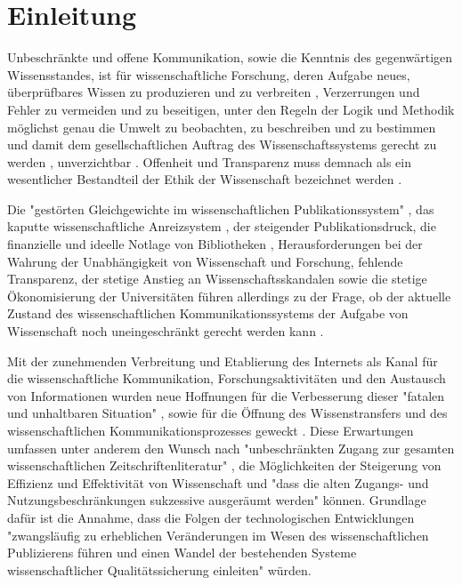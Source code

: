 \chapter{Einleitung}

Unbeschränkte und offene Kommunikation, sowie die Kenntnis des gegenwärtigen Wissensstandes, ist für wissenschaftliche Forschung, deren Aufgabe neues, überprüfbares Wissen zu produzieren \cite[:551]{Luescher_2014} \cite[:298]{Luhmann1998} und zu verbreiten \cite[:100]{graefen2007_wissenschaftliche_artikel}, Verzerrungen und Fehler zu vermeiden und zu beseitigen, unter den Regeln der Logik und Methodik \cite[:93]{Weber_1992} möglichst genau die Umwelt zu beobachten, zu beschreiben und zu bestimmen \cite[:124]{Luhmann1998} und damit dem gesellschaftlichen Auftrag des Wissenschaftssystems gerecht zu werden \cite[:3]{Hanekop_2014}, unverzichtbar \cite{glaeser2006} \cite{gibbons_1994}. Offenheit und Transparenz muss demnach als ein wesentlicher Bestandteil der Ethik der Wissenschaft bezeichnet werden \cite{Peters_2014} \cite{resnik_2005_ethics}.

Die "gestörten Gleichgewichte im wissenschaftlichen Publikationssystem" \cite{cite:0}, das kaputte wissenschaftliche Anreizsystem \cite{osterloh2008anreize}, der steigender Publikationsdruck, die finanzielle und ideelle Notlage von Bibliotheken \cite{russell_2008_business} \cite{Sietmann_oa_2007}, Herausforderungen bei der Wahrung der Unabhängigkeit von Wissenschaft und Forschung, fehlende Transparenz, der stetige Anstieg an Wissenschaftsskandalen \cite{brembs2015open} sowie die stetige Ökonomisierung der Universitäten \cite{bauer2006} führen allerdings zu der Frage, ob der aktuelle Zustand des wissenschaftlichen Kommunikationssystems der Aufgabe von Wissenschaft noch uneingeschränkt gerecht werden kann \cite{Schekman_2013}.

Mit der zunehmenden Verbreitung und Etablierung des Internets als Kanal für die wissenschaftliche Kommunikation, Forschungsaktivitäten und den Austausch von Informationen wurden neue Hoffnungen für die Verbesserung dieser "fatalen und unhaltbaren Situation" \cite{brembs2015open}, sowie für die Öffnung des Wissenstransfers \cite{schulze_2013_open} \cite{albert_2006_open_implications} und des wissenschaftlichen Kommunikationsprozesses geweckt \cite{Hanekop_2014} \cite{EuropeanCommission_sciencepub_2006} \cite{Goodrum_2001} \cite{Lawrence_1999}. Diese Erwartungen umfassen unter anderem den Wunsch nach "unbeschränkten Zugang zur gesamten wissenschaftlichen Zeitschriftenliteratur" \cite{boai_2002}, die Möglichkeiten der Steigerung von Effizienz und Effektivität von Wissenschaft \cite{Partha_1994_economics_science} und "dass die alten Zugangs- und Nutzungsbeschränkungen sukzessive ausgeräumt werden" \cite{boai_2002} können. Grundlage dafür ist die Annahme, dass die Folgen der technologischen Entwicklungen "zwangsläufig zu erheblichen Veränderungen im Wesen des wissenschaftlichen Publizierens führen und einen Wandel der bestehenden Systeme wissenschaftlicher Qualitätssicherung einleiten" \cite{berliner_erklaerung_2003} würden.

